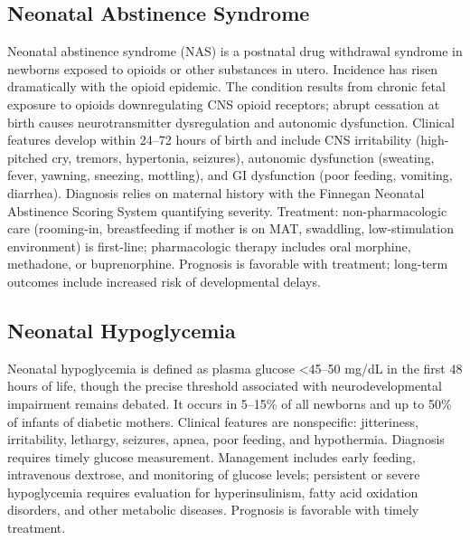 \subsection{Neonatal Abstinence Syndrome}
\label{sec:Neonatal Abstinence Syndrome}
Neonatal abstinence syndrome (NAS) is a postnatal drug withdrawal syndrome in newborns exposed to opioids or other substances in utero. Incidence has risen dramatically with the opioid epidemic. The condition results from chronic fetal exposure to opioids downregulating CNS opioid receptors; abrupt cessation at birth causes neurotransmitter dysregulation and autonomic dysfunction. Clinical features develop within 24--72 hours of birth and include CNS irritability (high-pitched cry, tremors, hypertonia, seizures), autonomic dysfunction (sweating, fever, yawning, sneezing, mottling), and GI dysfunction (poor feeding, vomiting, diarrhea). Diagnosis relies on maternal history with the Finnegan Neonatal Abstinence Scoring System quantifying severity. Treatment: non-pharmacologic care (rooming-in, breastfeeding if mother is on MAT, swaddling, low-stimulation environment) is first-line; pharmacologic therapy includes oral morphine, methadone, or buprenorphine. Prognosis is favorable with treatment; long-term outcomes include increased risk of developmental delays.

\subsection{Neonatal Hypoglycemia}
\label{sec:Neonatal Hypoglycemia}
Neonatal hypoglycemia is defined as plasma glucose <45--50 mg/dL in the first 48 hours of life, though the precise threshold associated with neurodevelopmental impairment remains debated. It occurs in 5--15\% of all newborns and up to 50\% of infants of diabetic mothers. Clinical features are nonspecific: jitteriness, irritability, lethargy, seizures, apnea, poor feeding, and hypothermia. Diagnosis requires timely glucose measurement. Management includes early feeding, intravenous dextrose, and monitoring of glucose levels; persistent or severe hypoglycemia requires evaluation for hyperinsulinism, fatty acid oxidation disorders, and other metabolic diseases. Prognosis is favorable with timely treatment.

